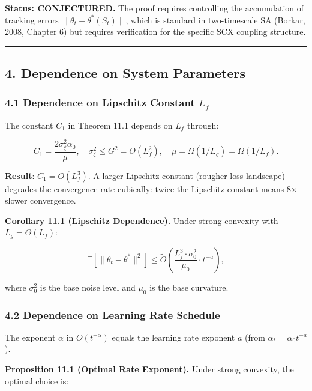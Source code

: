 \documentclass[
  12pt,
]{article}
\begin{document}
\textbf{Status: CONJECTURED.} The proof requires controlling the
accumulation of tracking errors \(\|\theta_t - \theta^*(S_t)\|\), which
is standard in two-timescale SA (Borkar, 2008, Chapter 6) but requires
verification for the specific SCX coupling structure.

\begin{center}\rule{0.5\linewidth}{0.5pt}\end{center}

\subsection{4. Dependence on System
Parameters}\label{dependence-on-system-parameters}

\subsubsection{\texorpdfstring{4.1 Dependence on Lipschitz Constant
\(L_f\)}{4.1 Dependence on Lipschitz Constant L\_f}}\label{dependence-on-lipschitz-constant-l_f}

The constant \(C_1\) in Theorem 11.1 depends on \(L_f\) through:

\[C_1 = \frac{2\sigma_\xi^2 \alpha_0}{\mu}, \quad \sigma_\xi^2 \leq G^2 = O(L_f^2), \quad \mu = \Omega(1/L_g) = \Omega(1/L_f).\]

\textbf{Result}: \(C_1 = O(L_f^3)\). A larger Lipschitz constant
(rougher loss landscape) degrades the convergence rate cubically: twice
the Lipschitz constant means 8× slower convergence.

\textbf{Corollary 11.1 (Lipschitz Dependence).} Under strong convexity
with \(L_g = \Theta(L_f)\):

\[\mathbb{E}[\|\theta_t - \theta^*\|^2] \leq \tilde{O}\!\left(\frac{L_f^3 \cdot \sigma_0^2}{\mu_0} \cdot t^{-a}\right),\]

where \(\sigma_0^2\) is the base noise level and \(\mu_0\) is the base
curvature.

\subsubsection{4.2 Dependence on Learning Rate
Schedule}\label{dependence-on-learning-rate-schedule}

The exponent \(\alpha\) in \(O(t^{-\alpha})\) equals the learning rate
exponent \(a\) (from \(\alpha_t = \alpha_0 t^{-a}\)).

\textbf{Proposition 11.1 (Optimal Rate Exponent).} Under strong
convexity, the optimal choice is:
\end{document}
